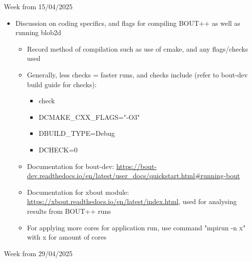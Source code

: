\documentclass{article}
\begin{document}
\begin{arrowlist}
    \item Week from 15/04/2025
    \begin{itemize}
        \item Discussion on coding specifics, and flags for compiling BOUT++ as well as running blob2d
        \begin{itemize}
            \item Record method of compilation such as use of cmake, and any flags/checks used
            \item Generally, less checks = faster runs, and checks include (refer to bout-dev build guide for checks):
            \begin{itemize}
                \item check
                \item DCMAKE\_CXX\_FLAGS="-O3"
                \item DBUILD\_TYPE=Debug
                \item DCHECK=0
            \end{itemize}
            \item Documentation for bout-dev: \url{https://bout-dev.readthedocs.io/en/latest/user_docs/quickstart.html#running-bout}
            \item Documentation for xbout module: \url{https://xbout.readthedocs.io/en/latest/index.html}, used for analysing results from BOUT++ runs
            \item For applying more cores for application run, use command "mpirun -n x" with x for amount of cores
        \end{itemize}
    \end{itemize}
    \item Week from 29/04/2025
\end{arrowlist}
\end{document}
